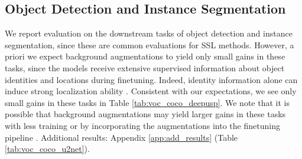 \documentclass[twoside,11pt]{article}
\begin{document}
\subsection{Object Detection and Instance Segmentation}
We report evaluation on the downstream tasks of object detection and instance segmentation, since these are common evaluations for SSL methods. However, a priori we expect background augmentations to yield only small gains in these tasks, since the models receive extensive supervised information about object identities and locations during finetuning. Indeed, identity information alone can induce strong localization ability \citep{simonyan_deep_2013}. Consistent with our expectations, we see only small gains in these tasks in Table \ref{tab:voc_coco_deepusp}. We note that it is possible that background augmentations may yield larger gains in these tasks with less training or by incorporating the augmentations into the finetuning pipeline \citep{ghiasi2020simple}. Additional results: Appendix \ref{app:add_results} (Table \ref{tab:voc_coco_u2net}).
\end{document}
